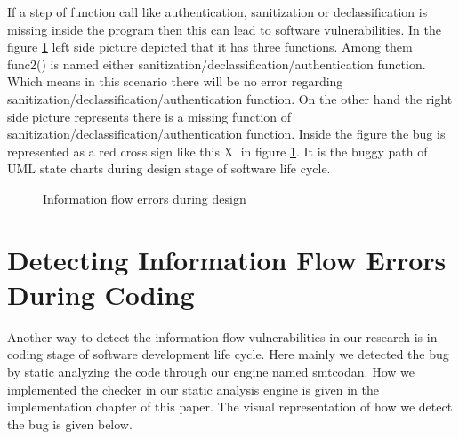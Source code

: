 If a step of function call like authentication, sanitization or declassification is missing inside the program then this can lead to software vulnerabilities. In the figure \ref{figure_FunctionCallMissing} left side picture depicted that it has three functions. Among them func2() is named either sanitization/declassification/authentication function. Which means in this scenario there will be no error regarding sanitization/declassification/authentication function. On the other hand the right side picture represents there is a missing function of sanitization/declassification/authentication function. Inside the figure the bug is represented as a red cross sign like this \textcircled{X} in figure \ref{figure_FunctionCallMissing}. It is the buggy path of UML state charts during design stage of software life cycle. 
\begin{figure}[htbp]
	\centering
	\caption{Information flow errors during design}
	\label{figure_FunctionCallMissing}
\end{figure}


\section{ Detecting Information Flow Errors During Coding}

Another way to detect the information flow vulnerabilities in our research is in coding stage of software development life cycle. Here mainly we detected the bug by static analyzing the code through our engine named smtcodan. How we implemented the checker in our static analysis engine is given in the implementation chapter of this paper. The visual representation of how we detect the bug is given below.

